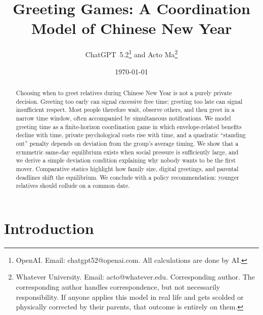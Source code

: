 \documentclass[AER]{AEA}
\begin{document}
\title{Greeting Games: A Coordination Model of Chinese New Year}

\author{ChatGPT~5.2\thanks{OpenAI. Email: chatgpt52@openai.com. All calculations are done by AI.} 
and Acto Ma\thanks{Whatever University. Email: acto@whatever.edu. Corresponding author. The corresponding author handles correspondence, but not necessarily responsibility. If anyone applies this model in real life and gets scolded or physically corrected by their parents, that outcome is entirely on them.}
}

\date{\today}


\begin{abstract}
Choosing when to greet relatives during Chinese New Year is not a purely private decision. Greeting too early can signal excessive free time; greeting too late can signal insufficient respect. Most people therefore wait, observe others, and then greet in a narrow time window, often accompanied by simultaneous notifications. We model greeting time as a finite-horizon coordination game in which envelope-related benefits decline with time, private psychological costs rise with time, and a quadratic ``standing out'' penalty depends on deviation from the group's average timing. We show that a symmetric same-day equilibrium exists when social pressure is sufficiently large, and we derive a simple deviation condition explaining why nobody wants to be the first mover. Comparative statics highlight how family size, digital greetings, and parental deadlines shift the equilibrium. We conclude with a policy recommendation: younger relatives should collude on a common date.
\end{abstract}

\maketitle



\section{Introduction}
\end{document}
